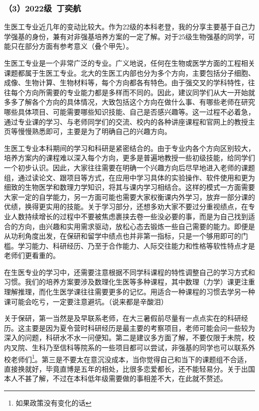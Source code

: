 \documentclass[11pt,oneside]{book}
\begin{document}
\subsubsection{（3）2022级\ 丁奕航}

生医工专业近几年的变动比较大。作为22级的本科老登，我的分享主要基于自己力学强基的身份，兼有对非强基培养方案的一定了解。对于25级生物强基的同学，可能只在部分方面有参考意义（叠个甲先）。

\vspace{10pt}

生医工专业是一个非常广泛的专业。广义地说，任何在生物或医学方面的工程相关课题都属于生医工专业。北大的生医工内部也分为多个方向，主要包括分子细胞、成像、生物计算、生物材料等，每个方向都各有特色。由于强交叉的学科特性，往往每个方向所需要的专业能力都是多样而不同的。因此，建议同学们从大一开始就多多了解各个方向的具体情况，大致包括这个方向在做什么事、有哪些老师在研究哪些具体项目、可能需要哪些知识技能、自己是否感兴趣等。这一过程不必着急，通过专业课的学习、与老师同学们的交流、校内的各种讲座课程和官网上的教授主页等慢慢熟悉即可，主要是为了明确自己的兴趣方向。

\vspace{10pt}

生医工专业本科期间的学习和科研是紧密结合的。由于专业内各个方向区别较大，培养方案内的课程难以深入每个方向，更多是普遍地教授一些初级技能，给同学们一个初步认识。因此，大家往往需要在明确一个兴趣方向后尽早地进入老师的课题组，通过读论文、跟项目等方式，在应用中学习具体的实验操作、软件使用和更为细致的生物医学和数理力学知识，将其与课内学习相结合。这样的模式一方面需要大家一定的自学能力，另一方面可能也需要大家权衡课内外学习，放弃一部分课的优绩，换得更实用的技能。关于学习部分，还想多劝大家不要过分重视绩点，在专业人数持续增长的过程中不要被焦虑裹挟去卷一些没必要的事，而是为自己找到适合的方向，由兴趣和实用需求驱动，放松心态去锻炼一些自己需要的能力。即便是从功利角度出发，在保研和留学中绩点也并非第一指标，只是一个够用即可的门槛。学习能力、科研经历、乃至于合作能力、人际交往能力和性格等软性特点才是老师们更看重的。

\vspace{10pt}

在生医专业的学习中，还需要注意根据不同学科课程的特性调整自己的学习方式和习惯。我们的培养方案要涉及数理化生医等多种课程，其中数理（力学）课更注重理解推理，而化生医学课往往需要更多的记忆。用适合一种课程的习惯去学另一种课可能会吃亏，一定要注意避坑。（说来都是辛酸泪）

\vspace{10pt}

关于保研，第一当然是及早联系老师，在大三暑假前尽量有一点点实在的科研经历。这主要是因为夏令营时科研经历是最主要的考察项目，老师可能会问一些较为深入的问题，科研水不水一问便知。第二是建议多方面了解，不要仅限于未院，校内叉院、生科乃至信科等院系的一些项目都可以尝试，非强基的同学也可以联系外校老师们\footnote{如果政策没有变化的话}。第三是不要太在意沉没成本，当你觉得自己和当下的课题组不合适，直接换就好，毕竟直博是五年的相处，比很多恋爱都长，还不能轻易分。关于出国本人不甚了解，不过在本科低年级需要做的事相差不大，在此就不赘述。
\end{document}
